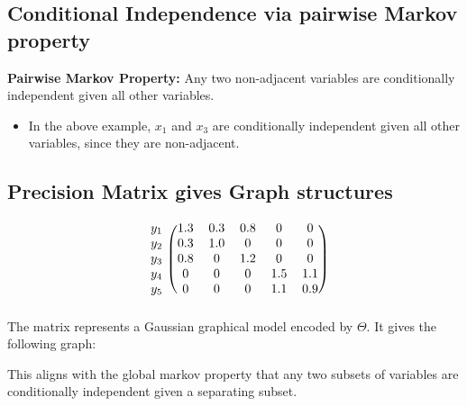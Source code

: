 \documentclass[10pt]{article}
\begin{document}
\subsection*{Conditional Independence via pairwise Markov property}
\textbf{Pairwise Markov Property:} Any two non-adjacent variables are conditionally independent given all other variables.
\begin{itemize}
	\item In the above example, $x_1$ and $x_3$ are conditionally independent given all other variables, since they are non-adjacent.
\end{itemize}

\subsection*{Precision Matrix gives Graph structures}
\[\begin{blockarray}{cccccc}
    \begin{block}{c(ccccc)}
    y_1 & 1.3 & 0.3 & 0.8 & 0 & 0 \\
    y_2 & 0.3 & 1.0 & 0 & 0 & 0 \\
    y_3 & 0.8 & 0 & 1.2 & 0 & 0 \\
    y_4 & 0 & 0 & 0 & 1.5 & 1.1 \\
    y_5 & 0 & 0 & 0 & 1.1 & 0.9 \\
    \end{block}
    \end{blockarray}
\]
The matrix represents a Gaussian graphical model encoded by $\Theta$.  It gives the following graph:
\begin{center}
\end{center}
This aligns with the global markov property that any two subsets of variables are conditionally independent given a separating subset.
\end{document}

